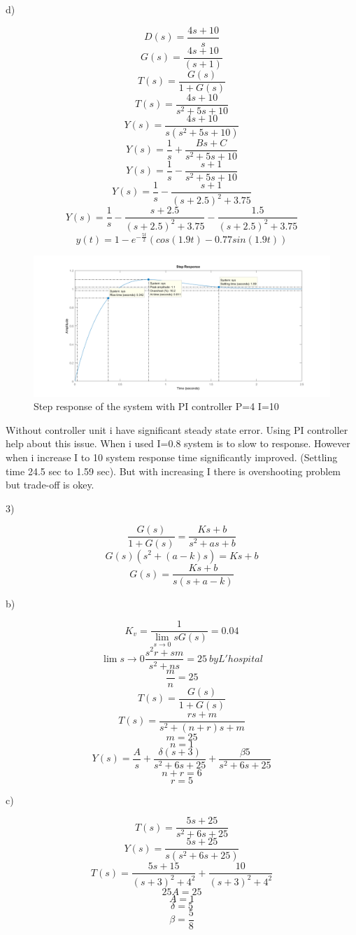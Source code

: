 \documentclass[11pt]{article}
\begin{document}
d)

\[D(s)=\frac{4s+10}{s}\]
\[G(s)=\frac{4s+10}{(s+1)}\]
\[T(s)=\frac{G(s)}{1+G(s)}\]
\[T(s)=\frac{4s+10}{s^2+5s+10}\]
\[Y(s)=\frac{4s+10}{s(s^2+5s+10)}\]
\[Y(s)=\frac{1}{s}+\frac{Bs+C}{s^2+5s+10}\]
\[Y(s)=\frac{1}{s}-\frac{s+1}{s^2+5s+10}\]
\[Y(s)=\frac{1}{s}-\frac{s+1}{(s+2.5)^2+3.75}\]
\[Y(s)=\frac{1}{s}-\frac{s+2.5}{(s+2.5)^2+3.75}-\frac{1.5}{(s+2.5)^2+3.75}\]
\[y(t)=1-e^{-\frac{5t}{2}}(cos(1.9t)-0.77sin(1.9t))\]



\begin{figure}[H]
  \includegraphics[scale=0.7, center]{step3}
  \caption{Step response of the system with PI controller P=4 I=10}
  \label{fig:zero}
\end{figure}


Without controller unit i have significant steady state error. Using PI controller help about this issue. When i used I=0.8 system is to slow to response. However when i increase I to 10 system response time significantly improved. (Settling time 24.5 sec to 1.59 sec). But with increasing I there is overshooting problem but trade-off is okey. 

3)

\[\frac{G(s)}{1+G(s)}=\frac{Ks+b}{s^2+as+b}\]
\[G(s)(s^2+(a-k)s)=Ks+b\]
\[G(s)=\frac{Ks+b}{s(s+a-k)}\]


b)

$$K_v=\frac{1}{\lim_{s\to 0} sG(s)}=0.04$$
\[\lim{s\to 0} \frac{s^2r+sm}{s^2+ns}=25 \> by L'hospital\] 
$$\frac{m}{n}=25$$
\[T(s)=\frac{G(s)}{1+G(s)}\]
\[T(s)=\frac{rs+m}{s^2+(n+r)s+m}\]
$$m=25$$
$$n=1$$
\[Y(s)=\frac{A}{s}+\frac{\delta(s+3)}{s^2+6s+25}+\frac{\beta5}{s^2+6s+25}\]
\[n+r=6\]
$$r=5$$

c)

\[T(s)=\frac{5s+25}{s^2+6s+25}\]
\[Y(s)=\frac{5s+25}{s(s^2+6s+25)}\]
\[T(s)=\frac{5s+15}{(s+3)^2+4^2}+\frac{10}{(s+3)^2+4^2}\]
\[25A=25\]
$$A=1$$
$$\delta=5$$
$$\beta=\frac{5}{8}$$
\end{document}
